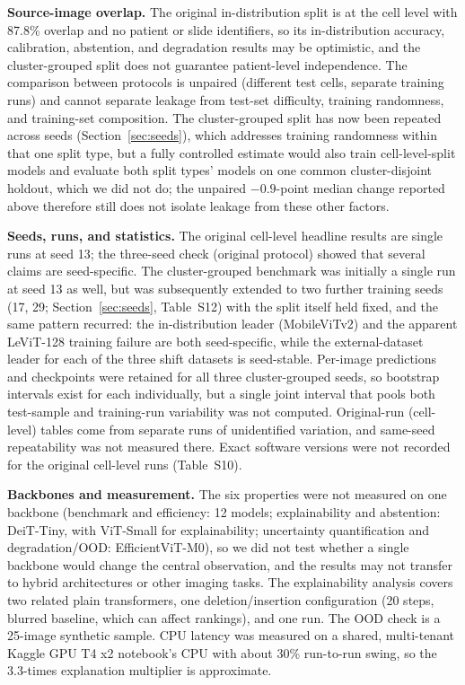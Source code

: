 \documentclass[12pt,letterpaper]{article}
\begin{document}
\textbf{Source-image overlap.} The original in-distribution split is at the cell level with 87.8\% overlap and no patient or slide identifiers, so its in-distribution accuracy, calibration, abstention, and degradation results may be optimistic, and the cluster-grouped split does not guarantee patient-level independence. The comparison between protocols is unpaired (different test cells, separate training runs) and cannot separate leakage from test-set difficulty, training randomness, and training-set composition. The cluster-grouped split has now been repeated across seeds (Section~\ref{sec:seeds}), which addresses training randomness within that one split type, but a fully controlled estimate would also train cell-level-split models and evaluate both split types' models on one common cluster-disjoint holdout,\cite{saeb2017,rumala2023} which we did not do; the unpaired $-0.9$-point median change reported above therefore still does not isolate leakage from these other factors.

\textbf{Seeds, runs, and statistics.} The original cell-level headline results are single runs at seed 13; the three-seed check (original protocol) showed that several claims are seed-specific. The cluster-grouped benchmark was initially a single run at seed 13 as well, but was subsequently extended to two further training seeds (17, 29; Section~\ref{sec:seeds}, Table~S12) with the split itself held fixed, and the same pattern recurred: the in-distribution leader (MobileViTv2) and the apparent LeViT-128 training failure are both seed-specific, while the external-dataset leader for each of the three shift datasets is seed-stable. Per-image predictions and checkpoints were retained for all three cluster-grouped seeds, so bootstrap intervals exist for each individually, but a single joint interval that pools both test-sample and training-run variability was not computed. Original-run (cell-level) tables come from separate runs of unidentified variation, and same-seed repeatability was not measured there. Exact software versions were not recorded for the original cell-level runs (Table~S10).

\textbf{Backbones and measurement.} The six properties were not measured on one backbone (benchmark and efficiency: 12 models; explainability and abstention: DeiT-Tiny, with ViT-Small for explainability; uncertainty quantification and degradation/OOD: EfficientViT-M0), so we did not test whether a single backbone would change the central observation, and the results may not transfer to hybrid architectures or other imaging tasks. The explainability analysis covers two related plain transformers, one deletion/insertion configuration (20 steps, blurred baseline, which can affect rankings), and one run. The OOD check is a 25-image synthetic sample. CPU latency was measured on a shared, multi-tenant Kaggle GPU T4 x2 notebook's CPU with about 30\% run-to-run swing, so the 3.3-times explanation multiplier is approximate.
\end{document}
